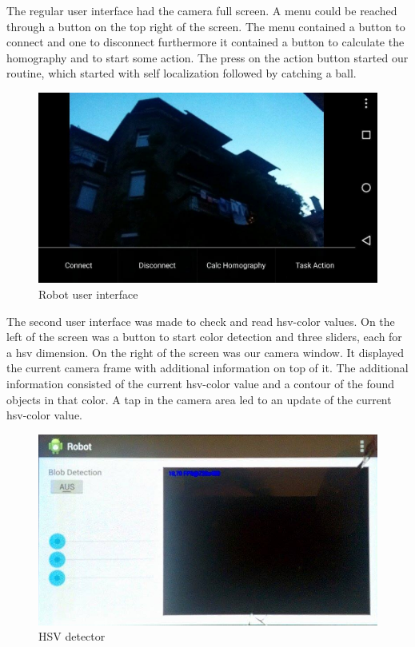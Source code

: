 \documentclass[703030]{./includes/iisreport}
\begin{document}
  The regular user interface had the camera full screen. A menu could be reached through a button
  on the top right of the screen. The menu contained a button to connect and one to disconnect
  furthermore it contained a button to calculate the homography and to start some action. The 
  press on the action button started our routine, which started with self localization followed 
  by catching a ball. \\
  
  \begin{figure}[h]
	\centering
	\includegraphics[scale=0.3]{./graphics/robotgui.jpg}
	\caption{Robot user interface}
	\label{img:robotgui}
  \end{figure}
  
  The second user interface was made to check and read hsv-color values. On the left of the screen
  was a button to start color detection and three sliders, each for a hsv dimension. On the right
  of the screen was our camera window. It displayed the current camera frame with additional information
  on top of it. The additional information consisted of the current hsv-color value and a contour
  of the found objects in that color. A tap in the camera area led to an update of the current
  hsv-color value.
  
  \begin{figure}[h]
	\centering
	\includegraphics[scale=0.4]{./graphics/hsvgui.jpg}
	\caption{HSV detector}
	\label{img:hsvgui}
  \end{figure}
  
\end{document}
